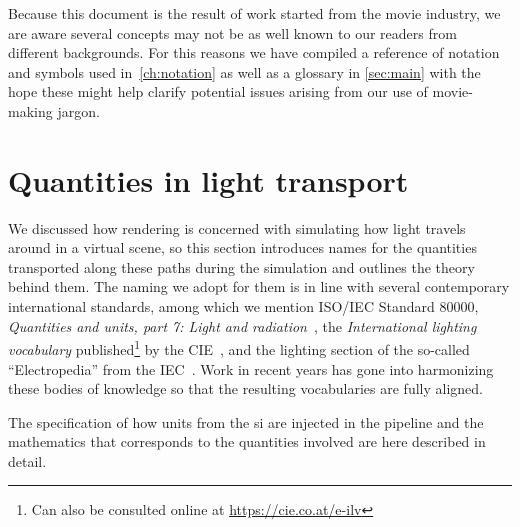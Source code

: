 Because this document is the result of work started from the movie industry, 
we are aware several concepts may not be as well known to our readers from different backgrounds. 
For this reasons we have compiled a reference of notation and symbols used in~\cref{ch:notation} 
as well as a glossary in \cref{sec:main} with the hope these might help clarify potential issues arising 
from our use of movie-making jargon.

\section{Quantities in light transport}

We discussed how \gls{rendering} is concerned with simulating how light travels around in 
a \gls{virtual scene}, so this section introduces names for the quantities transported 
along these paths during the simulation and outlines the theory behind them. 
The naming we adopt for them is in line with several contemporary international standards, 
among which we mention ISO/IEC Standard 80000, 
\emph{Quantities and units, part 7: Light and radiation}~\cite{iso:80000-7:2019}, 
the \emph{International lighting vocabulary} published\footnote{Can also be consulted 
	online at \url{https://cie.co.at/e-ilv}} by the \gls{CIE}~\cite{cie:s017.2020},
and the lighting section of the so-called ``Electropedia'' from the \gls{IEC}~\cite{iec:60050-845:2020}.
Work in recent years has gone into harmonizing these bodies of knowledge so that the resulting 
vocabularies are fully aligned. 

The specification of how units from the \gls{si} are injected in 
the pipeline and the mathematics that corresponds to the quantities 
involved are here described in detail.

